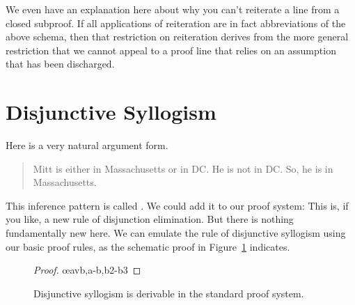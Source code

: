 We even have an explanation here about why you can't reiterate a line from a closed subproof. If all applications of reiteration are in fact abbreviations of the above schema, then that restriction on reiteration derives from the more general restriction that we cannot appeal to a proof line that relies on an assumption that has been discharged.

\section{Disjunctive Syllogism}
Here is a very natural argument form.
	\begin{quote}
		Mitt is either in Massachusetts or in DC. He is not in DC. So, he is in Massachusetts.
	\end{quote}
This inference pattern is called . We could add it to our proof system:
This is, if you like, a new rule of disjunction elimination.
But there is nothing fundamentally new here. We can emulate the rule of disjunctive syllogism using our basic proof rules, as the schematic proof in Figure~\ref{fig.dsder} indicates. \begin{figure}
	\begin{proof}
	\have[\ ]{}{\vdots}
	\open
		\open
			\close
		\close
		\open
		\close
	\oe{avb,a-b,b2-b3}
\end{proof}
\caption{Disjunctive syllogism is derivable in the standard proof system.\label{fig.dsder}}
\end{figure}


